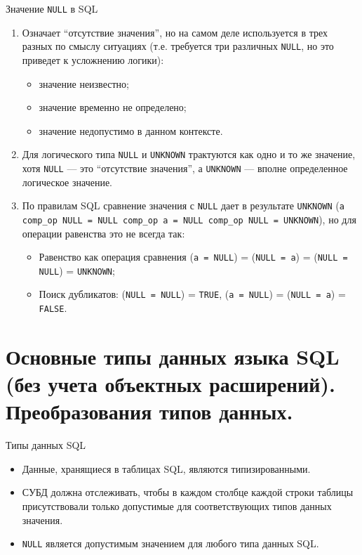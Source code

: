 \documentclass[a4paper,12pt]{article}
\begin{document}
Значение \texttt{NULL} в SQL  
\begin{enumerate}
    \item Означает ``отсутствие значения'', но на самом деле используется в трех разных по смыслу ситуациях (т.е. требуется три различных \texttt{NULL}, но это приведет к усложнению логики):
    \begin{itemize}
        \item значение неизвестно;
        \item значение временно не определено;
        \item значение недопустимо в данном контексте.
    \end{itemize}
    
    \item Для логического типа \texttt{NULL} и \texttt{UNKNOWN} трактуются как одно и то же значение, хотя \texttt{NULL} — это ``отсутствие значения'', а \texttt{UNKNOWN} — вполне определенное логическое значение.
    
    \item По правилам SQL сравнение значения с \texttt{NULL} дает в результате \texttt{UNKNOWN} (\texttt{a comp\_op NULL = NULL comp\_op a = NULL comp\_op NULL = UNKNOWN}), но для операции равенства это не всегда так:
    \begin{itemize}
        \item Равенство как операция сравнения (\texttt{a = NULL}) = (\texttt{NULL = a}) = (\texttt{NULL = NULL}) = \texttt{UNKNOWN};
        \item Поиск дубликатов: (\texttt{NULL = NULL}) = \texttt{TRUE}, (\texttt{a = NULL}) = (\texttt{NULL = a}) = \texttt{FALSE}.
    \end{itemize}
\end{enumerate}

\section{Основные типы данных языка SQL (без учета объектных расширений). Преобразования типов данных.}

Типы данных SQL  
\begin{itemize}
    \item Данные, хранящиеся в таблицах SQL, являются типизированными.
    \item СУБД должна отслеживать, чтобы в каждом столбце каждой строки таблицы присутствовали только допустимые для соответствующих типов данных значения.
    \item \texttt{NULL} является допустимым значением для любого типа данных SQL.
\end{itemize}
\end{document}
